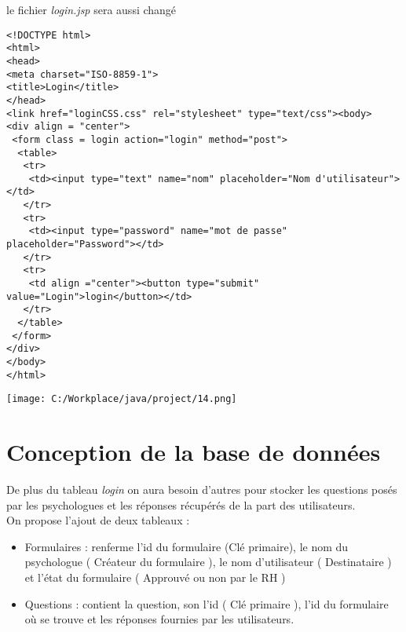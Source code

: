 \documentclass[12]{article}
\begin{document}
le fichier \textit{login.jsp} sera aussi changé 


\lstset{language=XML}
\begin{small}
\begin{lstlisting}
<!DOCTYPE html>
<html>
<head>
<meta charset="ISO-8859-1">
<title>Login</title>
</head>
<link href="loginCSS.css" rel="stylesheet" type="text/css"><body>
<div align = "center">
 <form class = login action="login" method="post">
  <table>
   <tr>
    <td><input type="text" name="nom" placeholder="Nom d'utilisateur"></td>
   </tr>
   <tr>
    <td><input type="password" name="mot de passe" placeholder="Password"></td>
   </tr>
   <tr>
    <td align ="center"><button type="submit" value="Login">login</button></td>
   </tr>
  </table>
 </form>
</div>
</body>
</html>
\end{lstlisting}
\end{small}

\begin{center}
\hspace*{-2cm}\texttt{[image: C:/Workplace/java/project/14.png]}
\end{center}














\section{Conception de la base de données}

De plus du tableau \textit{login} on aura besoin d'autres pour stocker les questions posés par les psychologues et les réponses récupérés de la part des utilisateurs.\\
On propose l'ajout de deux tableaux :\\
\begin{itemize}
\item Formulaires : renferme l'id du formulaire (Clé primaire), le nom du psychologue ( Créateur du formulaire ), le nom d'utilisateur ( Destinataire ) et l'état du formulaire ( Approuvé ou non par le RH )\\
\item Questions : contient la question, son l'id ( Clé primaire ), l'id du formulaire où se trouve et les réponses fournies par les utilisateurs.
\end{itemize}
\end{document}
